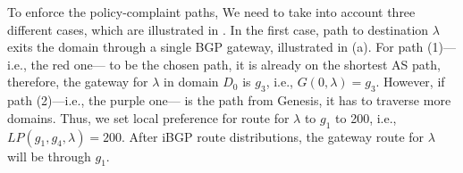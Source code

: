 To enforce the policy-complaint paths, 
We need to take into account three different
cases, which are illustrated in .  
In the first case, path to destination $\lambda$
exits the domain through a single BGP gateway, illustrated in 
(a). For path (1)---i.e., the red one---
to be the chosen path, it is already on the shortest AS path, 
therefore, the gateway for $\lambda$ in domain $D_0$ is $g_3$, i.e.,
$G(0, \lambda) = g_3$. However, if path (2)---i.e., the purple one---
is the path from Genesis, it has to traverse more domains. Thus, 
we set local preference for route for $\lambda$ to $g_1$ to 200, i.e.,
$LP(g_1, g_4, \lambda) = 200$. After iBGP route distributions, the 
gateway route for $\lambda$ will be through $g_1$.


